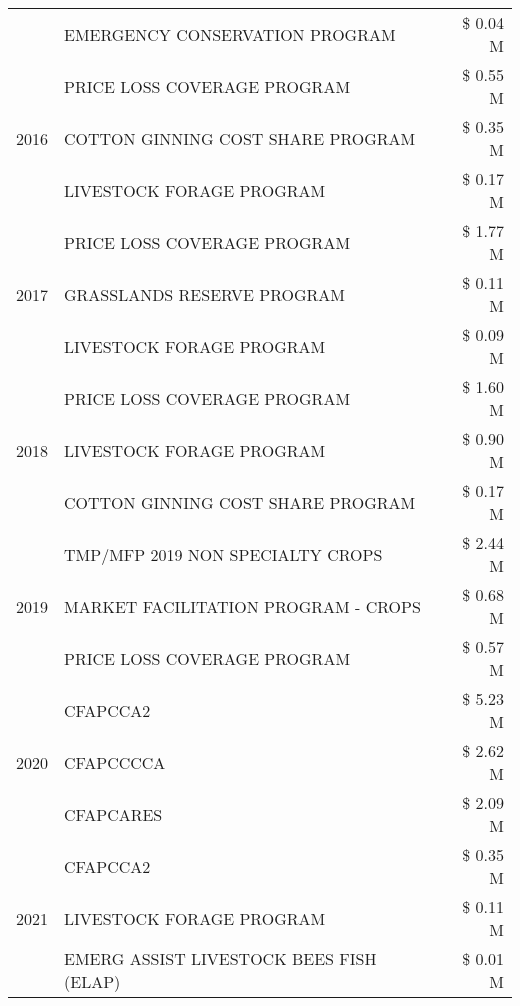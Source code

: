 \begin{tabular}{llr}
 & EMERGENCY CONSERVATION PROGRAM & \$ 0.04 M \\
\cline{1-3}
\multirow[t]{3}{*}{2016} & PRICE LOSS COVERAGE PROGRAM                   & \$ 0.55 M \\
 & COTTON GINNING COST SHARE PROGRAM             & \$ 0.35 M \\
 & LIVESTOCK FORAGE PROGRAM                      & \$ 0.17 M \\
\cline{1-3}
\multirow[t]{3}{*}{2017} & PRICE LOSS COVERAGE PROGRAM & \$ 1.77 M \\
 & GRASSLANDS RESERVE PROGRAM & \$ 0.11 M \\
 & LIVESTOCK FORAGE PROGRAM & \$ 0.09 M \\
\cline{1-3}
\multirow[t]{3}{*}{2018} & PRICE LOSS COVERAGE PROGRAM & \$ 1.60 M \\
 & LIVESTOCK FORAGE PROGRAM & \$ 0.90 M \\
 & COTTON GINNING COST SHARE PROGRAM & \$ 0.17 M \\
\cline{1-3}
\multirow[t]{3}{*}{2019} & TMP/MFP 2019 NON SPECIALTY CROPS & \$ 2.44 M \\
 & MARKET FACILITATION PROGRAM - CROPS & \$ 0.68 M \\
 & PRICE LOSS COVERAGE PROGRAM & \$ 0.57 M \\
\cline{1-3}
\multirow[t]{3}{*}{2020} & CFAPCCA2 & \$ 5.23 M \\
 & CFAPCCCCA & \$ 2.62 M \\
 & CFAPCARES & \$ 2.09 M \\
\cline{1-3}
\multirow[t]{3}{*}{2021} & CFAPCCA2 & \$ 0.35 M \\
 & LIVESTOCK FORAGE PROGRAM & \$ 0.11 M \\
 & EMERG ASSIST LIVESTOCK BEES FISH (ELAP) & \$ 0.01 M \\
\cline{1-3}
\bottomrule
\end{tabular}
